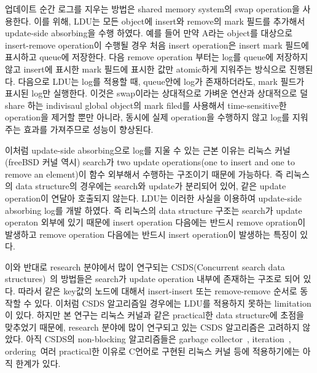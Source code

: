 업데이트 순간 로그를 지우는 방법은 shared memory system의 swap operation을 사용한다.
이를 위해, LDU는 모든 object에 insert와 remove의 mark 필드를 추가해서 update-side
absorbing을 수행 하였다.
예를 들어 만약 A라는 object를 대상으로 insert-remove operation이 수행될 경우 처음 insert operation은
insert mark 필드에 표시하고 queue에 저장한다.
다음 remove operation 부터는 log를 queue에 저장하지 않고 insert에 표시한 mark 필드에 표시한 값만
atomic하게 지워주는 방식으로 진행된다.
다음으로 LDU는 log를 적용할 때, queue안에 log가 존재하더라도, mark 필드가 표시된 log만 실행한다.
이것은 swap이라는 상대적으로 가벼운 연산과 상대적으로 덜 share 하는 indivisaul global object의 mark filed를
사용해서 time-sensitive한 operation을 제거할 뿐만 아니라, 동시에 실제 operation을 수행하지 않고 log를 지워주는
효과를 가져주므로 성능이 향상된다. 

\else
\fi


\ifkor
이처럼 update-side absorbing으로 log를 지울 수 있는 근본 이유는 리눅스 커널(freeBSD 커널 역시)
search가 two update operations(one to insert and one to remove an element)이 함수
외부해서 수행하는 구조이기 때문에 가능하다.
즉 리눅스의 data structure의 경우에는 search와 update가 분리되어 있어, 같은 update
operation이 연달아 호출되지 않는다.
LDU는 이러한 사실을 이용하여 update-side absorbing log를 개발 하였다. 
즉 리눅스의 data structure 구조는 search가 update operaton 외부에 있기 때문에 insert operation
다음에는 반드시 remove opration이 발생하고 remove operation 다음에는 반드시 insert operation이 발생하는
특징이 있다. %

이와 반대로 research 분야에서 많이 연구되는 CSDS(Concurrent search data
structures)~\cite{David2015ASYNCHRONIZED}의 방법들은 search가 update operation 내부에
존재하는 구조로 되어 있다.
따라서 같은 key값의 노드에 대해서 insert-insert 또는 remove-remove 순서로 동작할 수 있다.
이처럼 CSDS 알고리즘일 경우에는 LDU를 적용하지 못하는 limitation이 있다.
하지만 본 연구는 리눅스 커널과 같은 practical한 data structure에 초점을 맞추었기 때문에, 
research 분야에 많이 연구되고 있는 CSDS 알고리즘은 고려하지 않았다.
아직 CSDS의 non-blocking 알고리즘들은 garbage collector~\cite{AlBahra2013NAS},
iteration~\cite{petrank2013lock}, ordering~\cite{zhang2013practical}여러
practical한 이유로 C언어로 구현된 리눅스 커널 등에 적용하기에는 아직 한계가 있다.
\else
\fi

